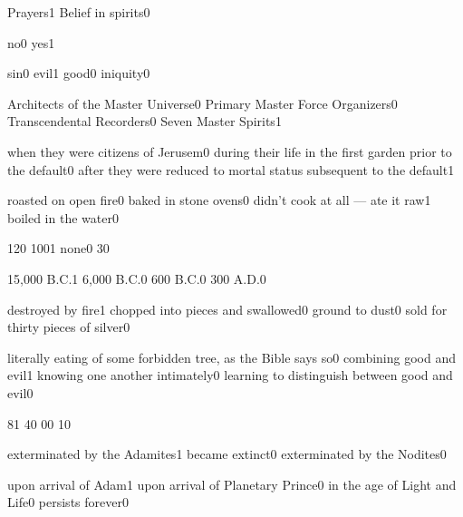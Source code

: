 {Prayers}{1}
{Belief in spirits}{0}
\qstop

{no}{0}
{yes}{1}
\qstop

{sin}{0}
{evil}{1}
{good}{0}
{iniquity}{0}
\qstop

{Architects of the Master Universe}{0}
{Primary Master Force Organizers}{0}
{Transcendental Recorders}{0}
{Seven Master Spirits}{1}
\qstop

{when they were citizens of Jerusem}{0}
{during their life in the first garden prior to the default}{0}
{after they were reduced to mortal status subsequent to the default}{1}
\qstop

{roasted on open fire}{0}
{baked in stone ovens}{0}
{didn't cook at all --- ate it raw}{1}
{boiled in the water}{0}
\qstop

{12}{0}
{100}{1}
{none}{0}
{3}{0}
\qstop

{15,000 B.C.}{1}
{6,000 B.C.}{0}
{600 B.C.}{0}
{300 A.D.}{0}
\qstop

{destroyed by fire}{1}
{chopped into pieces and swallowed}{0}
{ground to dust}{0}
{sold for thirty pieces of silver}{0}
\qstop

{literally eating of some forbidden tree, as the Bible says so}{0}
{combining good and evil}{1}
{knowing one another intimately}{0}
{learning to distinguish between good and evil}{0}
\qstop

{8}{1}
{4}{0}
{0}{0}
{1}{0}
\qstop

{exterminated by the Adamites}{1}
{became extinct}{0}
{exterminated by the Nodites}{0}
\qstop

{upon arrival of Adam}{1}
{upon arrival of Planetary Prince}{0}
{in the age of Light and Life}{0}
{persists forever}{0}
\qstop

